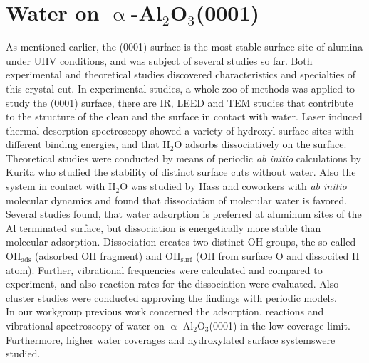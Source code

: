 \documentclass[11pt,DIV=13,BCOR=5mm,a4paper,headinclude]{scrbook}
\begin{document}
\chapter{Water on $\upalpha$-Al$_2$O$_3$(0001)}\label{sec:0001}
As mentioned earlier, the (0001) surface is the most stable surface site of alumina under UHV conditions, and was subject of several studies so far\cite{kuri10,hass98,hass00,Elam1998,Brown1999,Kelber2007,Tsyganenko1996,Chang1971,Lee1985,Nelson1998,Ranea2009,Thissen2009,Shapovalov2000,Wittbrodt1998,Wang2011}.
Both experimental and theoretical studies discovered characteristics and specialties of this crystal cut.
In experimental studies, a whole zoo of methods was applied to study the (0001) surface, there are IR\cite{Tsyganenko1996}, LEED\cite{Chang1971} and TEM\cite{Lee1985} studies that contribute to the structure of the clean and the surface in contact with water.
Laser induced thermal desorption spectroscopy\cite{Elam1998,Nelson1998} showed a variety of hydroxyl surface sites with different binding energies, and that H$_2$O adsorbs dissociatively on the surface.
Theoretical studies were conducted by means of periodic \textit{ab initio} calculations by Kurita\cite{kuri10} who studied the stability of distinct surface cuts without water. Also the system in contact with H$_2$O was studied by Hass and coworkers\cite{hass98,hass00} with \textit{ab initio} molecular dynamics and found that dissociation of molecular water is favored.
Several studies found, that water adsorption is preferred at aluminum sites of the Al terminated surface\cite{hass00,Ranea2009}, but dissociation is energetically more stable than molecular adsorption.
Dissociation creates two distinct OH groups, the so called OH$_\textrm{ads}$ (adsorbed OH fragment) and OH$_\textrm{surf}$ (OH from surface O and dissocited H atom)\cite{Thissen2009,Ranea2009}.
Further, vibrational frequencies were calculated and compared to experiment\cite{Wirth2014,Wang2011}, and also reaction rates for the dissociation were evaluated\cite{WirthJPCC2012,Wang2011}.
Also cluster studies were conducted approving the findings with periodic models\cite{Wittbrodt1998,Shapovalov2000}.
\\

In our workgroup previous work concerned the adsorption, reactions and vibrational spectroscopy of water on $\upalpha$-Al$_2$O$_3$(0001) in the low-coverage limit.
Furthermore, higher water coverages and hydroxylated surface systemswere studied\cite{WirthJPCC2012,Wirth2014,Wirth2015,Melani2018}.
\\\\
\end{document}
